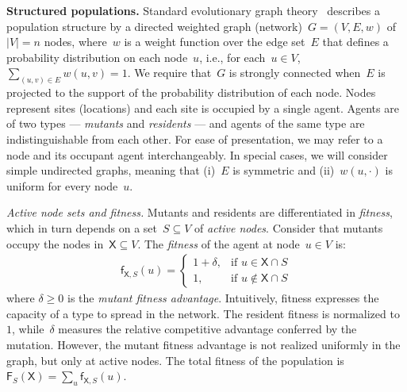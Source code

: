 \documentclass[letterpaper]{article}
\newcommand{\TotalFitness}{\mathsf{F}}
\newcommand{\Fitness}{\mathsf{f}}
\newcommand{\X}{\mathsf{X}}
\newcommand{\Paragraph}[1]{{\smallskip\noindent\bf #1}}
\newcommand{\SubParagraph}[1]{{\smallskip\noindent\em #1}}
\newcommand{\FitAdv}{\delta}
\newcommand{\Weight}{w}
\begin{document}
\Paragraph{Structured populations.} Standard evolutionary graph theory~\cite{Nowak2006} describes a population structure by a directed weighted graph (network)~$G=(V,E, \Weight)$ of~$|V|=n$ nodes, where~$\Weight$ is a weight function over the edge set~$E$ that defines a probability distribution on each node~$u$, i.e., for each~$u\in V$, $\sum_{(u,v)\in E}\Weight(u,v)=1$.
We require that~$G$ is strongly connected when~$E$ is projected to the support of the probability distribution of each node. Nodes represent sites (locations) and each site is occupied by a single agent. Agents are of two types --- \emph{mutants} and \emph{residents} --- and agents of the same type are indistinguishable from each other.
For ease of presentation, we may refer to a node and its occupant agent interchangeably. 
In special cases, we will consider simple undirected graphs, meaning that (i)~$E$ is symmetric and (ii)~$\Weight(u,\cdot)$ is uniform for every node~$u$.


\SubParagraph{Active node sets and fitness.} Mutants and residents are differentiated in \emph{fitness}, which in turn depends on a set~$S \!\subseteq\! V$ of \emph{active nodes}. 
Consider that mutants occupy the nodes in~$\X \!\subseteq\! V$. 
The \emph{fitness} of the agent at node~$u \!\in\! V$ is:
\begin{align}
\Fitness_{\X,S}(u)=
\begin{cases}
1+\FitAdv, & \text{if } u\in \X\cap S\\
1,         & \text{if } u\not \in \X\cap S
\end{cases}
\end{align}
where $\FitAdv\geq 0$ is the \emph{mutant fitness advantage}. 
Intuitively, fitness expresses the capacity of a type to spread in the network.
The resident fitness is normalized to~$1$, while~$\FitAdv$ measures the relative competitive advantage conferred by the mutation. 
However, the mutant fitness advantage is not realized uniformly in the graph, but only at active nodes. 
The total fitness of the population is $\TotalFitness_{S}(\X) = \sum_{u}\Fitness_{\X,S}(u)$.
\end{document}
